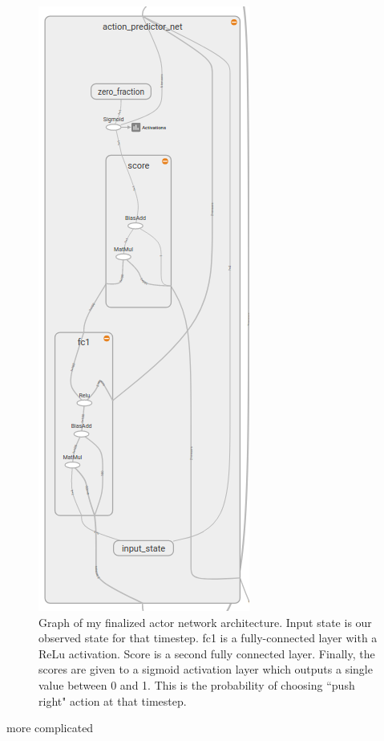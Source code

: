 \documentclass[12pt,a4paper]{article}
\begin{document}
\begin{figure}[htbp]
\begin{center}
\includegraphics[scale=0.6]{actor_net.png}
\caption{Graph of my finalized actor network architecture. Input state is our observed state for that timestep. fc1 is a fully-connected layer with a ReLu activation. Score is a second fully connected layer. Finally, the scores are given to a sigmoid activation layer which outputs a single value between 0 and 1. This is the probability of choosing ``push right" action at that timestep.}
\label{actor_net}
\end{center}
\end{figure}





more complicated
\end{document}
